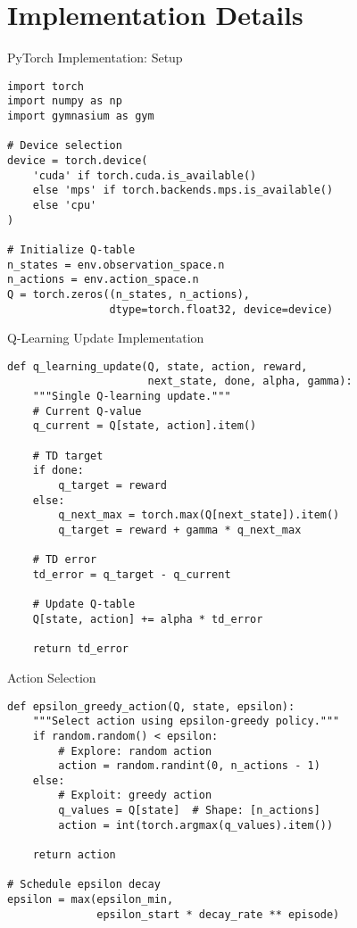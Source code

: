 \documentclass[aspectratio=169,10pt]{beamer}
\begin{document}
\section{Implementation Details}

\begin{frame}[fragile]{PyTorch Implementation: Setup}
\begin{lstlisting}
import torch
import numpy as np
import gymnasium as gym

# Device selection
device = torch.device(
    'cuda' if torch.cuda.is_available()
    else 'mps' if torch.backends.mps.is_available()
    else 'cpu'
)

# Initialize Q-table
n_states = env.observation_space.n
n_actions = env.action_space.n
Q = torch.zeros((n_states, n_actions), 
                dtype=torch.float32, device=device)
\end{lstlisting}
\end{frame}

\begin{frame}[fragile]{Q-Learning Update Implementation}
\begin{lstlisting}
def q_learning_update(Q, state, action, reward, 
                      next_state, done, alpha, gamma):
    """Single Q-learning update."""
    # Current Q-value
    q_current = Q[state, action].item()
    
    # TD target
    if done:
        q_target = reward
    else:
        q_next_max = torch.max(Q[next_state]).item()
        q_target = reward + gamma * q_next_max
    
    # TD error
    td_error = q_target - q_current
    
    # Update Q-table
    Q[state, action] += alpha * td_error
    
    return td_error
\end{lstlisting}
\end{frame}

\begin{frame}[fragile]{Action Selection}
\begin{lstlisting}
def epsilon_greedy_action(Q, state, epsilon):
    """Select action using epsilon-greedy policy."""
    if random.random() < epsilon:
        # Explore: random action
        action = random.randint(0, n_actions - 1)
    else:
        # Exploit: greedy action
        q_values = Q[state]  # Shape: [n_actions]
        action = int(torch.argmax(q_values).item())
    
    return action

# Schedule epsilon decay
epsilon = max(epsilon_min, 
              epsilon_start * decay_rate ** episode)
\end{lstlisting}
\end{frame}
\end{document}
